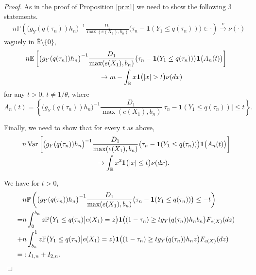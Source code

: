 \documentclass[12pt]{amsart}
\newcommand{\bbr}{\mathbb{R}}
\newcommand{\vague}{\stackrel{v}{\rightarrow}}
\newcommand{\LFe}{F_{e(X)}}
\newcommand{\1}{\mathbbm{1}}
\newcommand{\0}{\mathbf{0}}
\newcommand{\one}{\mathbf{1}}
\newcommand{\E}{\mathbb{E}}
\newcommand{\var}{\mathrm{Var}}
\theoremstyle{plain}
\theoremstyle{definition}
\newcommand{\bbP}{\mathbb{P}}
\begin{document}
\begin{proof}
As in the proof of Proposition \ref{pr:z1} we need to show the following 3
statements. 
\begin{align} \label{e:vague.interm}
&n\bbP\left( \bigl(g_Y(q(\tau_n))h_n\bigr)^{-1}\frac{D_1}{\max(e(X_1),b_n)}
  \bigl( \tau_n-\one(Y_1\leq q(\tau_n))\bigr) \in \cdot\right)\vague 
                                  \nu (\cdot) 
\end{align}
vaguely in $\overline{\bbr}\setminus \{0\}$, 
 \begin{align} \label{e:tr.m.interm}
&n\E\left[ \bigl(g_Y(q(\tau_n))h_n\bigr)^{-1}\frac{D_1}{\max(e(X_1),b_n)}
  \bigl( \tau_n-\one(Y_1\leq q(\tau_n))\bigr) \one\bigl( A_n(t)\bigr)\right] \\
\notag &\hskip 1.5in \to
m- \int_{\bbr} x\one\bigl( |x|>t\bigr)
\nu (dx)  
 \end{align}
 for  
 any $t>0, \, t\not=1/\theta$, where 
 \begin{equation*} \label{e:A.n1}
A_n(t) = \left\{ \bigl(g_Y(q(\tau_n))h_n\bigr)^{-1}\frac{D_1}{\max(e(X_1),b_n)}
  \bigl| \tau_n-\one(Y_1\leq q(\tau_n))\bigr|\leq t \right\}. 
\end{equation*}
%

Finally, we need to show that for every $t$ as above, 
%
\begin{align} \label{e:tr.v.interm}
&n\, \var\left[ \bigl(g_Y(q(\tau_n))h_n\bigr)^{-1}\frac{D_1}{\max(e(X_1),b_n)}
  \bigl( \tau_{n}-\one(Y_1\leq q(\tau_{n}))\bigr)  \one\bigl(
                               A_n(t)\bigr)\right] \\
\notag &\hskip 1.5in 
 \to
\int_{\bbr} x^2\one\bigl( |x|\leq t\bigr)
\nu (dx).  
\end{align}



  We have for $t>0$,
  \begin{align*} \label{e:split.neg.interm}
& n\bbP\left( \bigl(g_Y(q(\tau_n))h_n\bigr)^{-1}\frac{D_1}{\max(e(X_1),b_n)}
  \bigl( \tau_n-\one(Y_1\leq q(\tau_n))\bigr) \leq -t \right)\\
\notag =&n\int_0^{b_n} z\bbP\bigl(   Y_1\leq    q(\tau_n)
          \big| e(X_1)=z\bigr) \one \bigl( (1-\tau_n)\geq t g_Y(q(\tau_n))h_nb_n
          \bigr) \LFe(dz)\\ 
  \notag +& n\int_{b_n}^1 z\bbP\bigl(   Y_1\leq    q(\tau_n)
          \big| e(X_1)=z\bigr) \one \bigl( (1-\tau_n)\geq t g_Y(q(\tau_n))h_nz
          \bigr)  \LFe(dz)  \\
\notag =&: I_{1,n}+I_{2,n}.
\end{align*}


\end{proof}
\end{document}
